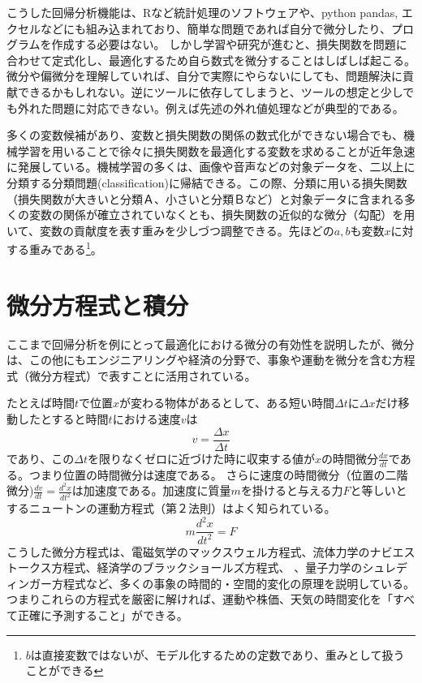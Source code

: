 \documentclass[times, 10pt,dvipdfmx]{jsarticle}
\newcommand{\vs}{\vspace{5mm}}
\begin{document}
\vs

こうした回帰分析機能は、Rなど統計処理のソフトウェアや、python pandas, エクセルなどにも組み込まれており、簡単な問題であれば自分で微分したり、プログラムを作成する必要はない。
しかし学習や研究が進むと、損失関数を問題に合わせて定式化し、最適化するため自ら数式を微分することはしばしば起こる。微分や偏微分を理解していれば、自分で実際にやらないにしても、問題解決に貢献できるかもしれない。逆にツールに依存してしまうと、ツールの想定と少しでも外れた問題に対応できない。例えば先述の外れ値処理などが典型的である。
\vs

多くの変数候補があり、変数と損失関数の関係の数式化ができない場合でも、機械学習を用いることで徐々に損失関数を最適化する変数を求めることが近年急速に発展している。機械学習の多くは、画像や音声などの対象データを、二以上に分類する分類問題(classification)に帰結できる。この際、分類に用いる損失関数（損失関数が大きいと分類Ａ、小さいと分類Ｂなど）と対象データに含まれる多くの変数の関係が確立されていなくとも、損失関数の近似的な微分（勾配）を用いて、変数の貢献度を表す重みを少しづつ調整できる。先ほどの$a,b$も変数$x$に対する重みである\footnote{$b$は直接変数ではないが、モデル化するための定数であり、重みとして扱うことができる}。


\section{微分方程式と積分}
ここまで回帰分析を例にとって最適化における微分の有効性を説明したが、微分は、この他にもエンジニアリングや経済の分野で、事象や運動を微分を含む方程式（微分方程式）で表すことに活用されている。

たとえば時間$t$で位置$x$が変わる物体があるとして、ある短い時間$\Delta t$に$\Delta x$だけ移動したとすると時間$t$における速度$v$は
\begin{equation}
v = \frac{\Delta x}{\Delta t}
\end{equation}
であり、この$\Delta t$を限りなくゼロに近づけた時に収束する値が$x$の時間微分$\frac{dx}{dt}$である。つまり位置の時間微分は速度である。
さらに速度の時間微分（位置の二階微分)$\frac{dv}{dt} = \frac{d^2x}{dt^2}$は加速度である。加速度に質量$m$を掛けると与える力$F$と等しいとするニュートンの運動方程式（第２法則）はよく知られている。
\begin{equation}
m\frac{d^2x}{dt^2} = F
\label{eq:newton}
\end{equation} 
こうした微分方程式は、電磁気学のマックスウェル方程式、流体力学のナビエストークス方程式、経済学のブラックショールズ方程式、
、量子力学のシュレディンガー方程式など、多くの事象の時間的・空間的変化の原理を説明している。つまりこれらの方程式を厳密に解ければ、運動や株価、天気の時間変化を「すべて正確に予測すること」ができる。
\end{document}
